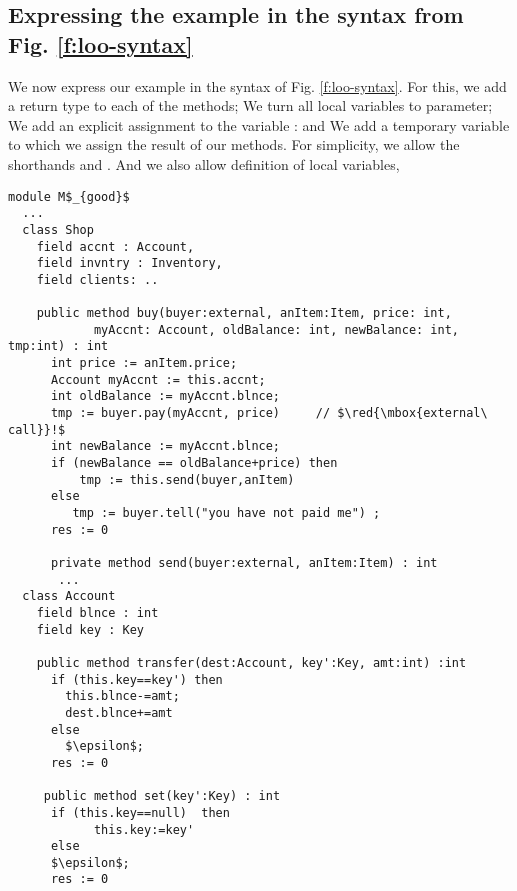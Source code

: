 \subsection{Expressing the  example in the syntax from Fig. \ref{f:loo-syntax}}
\label{s:app:syntax:transform}

{
We now express our example in the syntax of Fig. \ref{f:loo-syntax}. 
For this, we  add a return type to each of the methods; 
We turn all local variables to parameter; We add an explicit assignment to the variable : and We   add a temporary variable  to which we assign the result of our  methods.
For simplicity, we allow %
the shorthands \prg{+=} and \prg{-=}.
And we also allow definition of local variables, \eg  {} }

\begin{lstlisting}[mathescape=true, language=Chainmail, frame=lines]
module M$_{good}$
  ...   
  class Shop
    field accnt : Account, 
    field invntry : Inventory, 
    field clients: ..
  
    public method buy(buyer:external, anItem:Item, price: int, 
            myAccnt: Account, oldBalance: int, newBalance: int, tmp:int) : int
      int price := anItem.price;
      Account myAccnt := this.accnt;
      int oldBalance := myAccnt.blnce;
      tmp := buyer.pay(myAccnt, price)     // $\red{\mbox{external\ call}}!$
      int newBalance := myAccnt.blnce;
      if (newBalance == oldBalance+price) then
          tmp := this.send(buyer,anItem)
      else
         tmp := buyer.tell("you have not paid me") ; 
      res := 0
     
      private method send(buyer:external, anItem:Item) : int
       ... 
  class Account
    field blnce : int 
    field key : Key
    
    public method transfer(dest:Account, key':Key, amt:int) :int
      if (this.key==key') then
        this.blnce-=amt;
        dest.blnce+=amt
      else
        $\epsilon$;
      res := 0
	  
     public method set(key':Key) : int
      if (this.key==null)  then
      		this.key:=key'
      else 
	  $\epsilon$;
      res := 0
\end{lstlisting}

